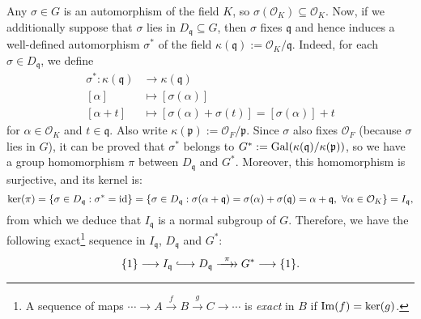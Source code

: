\documentclass[../main.tex]{subfiles}
\begin{document}
Any $\sigma\in G$ is an automorphism of the field $K$, so $\sigma(\mathcal{O}_K)\subseteq\mathcal{O}_K$. Now, if we additionally suppose that $\sigma$ lies in $D_{\mathfrak{q}}\subseteq G$, then $\sigma$ fixes $\mathfrak{q}$ and hence induces a well-defined automorphism $\sigma^*$ of the field $\kappa(\mathfrak{q}):=\mathcal{O}_K/\mathfrak{q}$. Indeed, for each $\sigma\in D_{\mathfrak{q}}$, we define
\begin{align*}
	\sigma^*: \kappa(\mathfrak{q})&\longrightarrow \kappa(\mathfrak{q})\\
	[\alpha] &\longmapsto [\sigma(\alpha)]\\
	[\alpha+t] &\longmapsto [\sigma(\alpha)+\sigma(t)]=[\sigma(\alpha)]+t
\end{align*}
for $\alpha\in\mathcal{O}_K$ and $t\in\mathfrak{q}$. 
Also write $\kappa(\mathfrak{p}):=\mathcal{O}_F/\mathfrak{p}$. Since $\sigma$ also fixes $\mathcal{O}_F$ (because $\sigma$ lies in $G$), it can be proved that $\sigma^*$ belongs to $G^*:=\operatorname{Gal}(\kappa(\mathfrak{q})/\kappa(\mathfrak{p}))$, so we have a group homomorphism $\pi$ between $D_{\mathfrak{q}}$ and $G^*$. Moreover, this homomorphism is surjective, and its kernel is:
\begin{equation}\label{eq:kerpi}
	\operatorname{ker}(\pi)=\{\sigma\in D_\mathfrak{q}: \sigma^*=\mathrm{id}\}=\{\sigma\in D_\mathfrak{q}: \sigma(\alpha+\mathfrak{q})=\sigma(\alpha)+\sigma(\mathfrak{q})=\alpha+\mathfrak{q}, \ \forall \alpha\in \mathcal{O}_K\}=I_\mathfrak{q},
\end{equation}
from which we deduce that $I_\mathfrak{q}$ is a normal subgroup of $G$.
Therefore, we have the following exact\footnote{A sequence of maps $\cdots\rightarrow A\xrightarrow{f} B\xrightarrow{g} C\rightarrow\cdots$ is \emph{exact} in $B$ if $\operatorname{Im}(f)=\operatorname{ker}(g)$.} sequence in $I_\mathfrak{q}$, $D_\mathfrak{q}$ and $G^*$:
\begin{equation*}
	\{1\}\longrightarrow I_{\mathfrak{q}}\hooklongrightarrow D_{\mathfrak{q}}\stackrel{\pi}{\rrightarrow} G^*\longrightarrow \{1\}.
\end{equation*}
\end{document}
